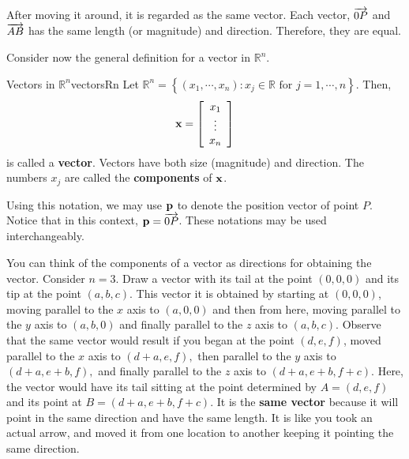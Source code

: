After moving it around, it is regarded as the same vector. Each vector, $\overrightarrow{0P}$ and $\overrightarrow{AB}$ has the same length (or magnitude) and direction. Therefore, they are equal. 

Consider now the general definition for a vector in $\mathbb{R}^n$. 

\begin{definition}{Vectors in $\mathbb{R}^n$}{vectorsRn}
Let $\mathbb{R}^{n} = \left\{ \left( x_{1}, \cdots, x_{n}\right)
:x_{j}\in \mathbb{R}\text{ for }j=1,\cdots ,n\right\} .$
Then,
\begin{equation*}
\mathbf{x}
=
\left[ \begin{array}{c}
x_{1} \\
\vdots \\
x_{n}
\end{array}
\right] 
\end{equation*}
is called a \textbf{vector}. Vectors have both size (magnitude) and direction. 
The numbers $x_{j}$ are called the \textbf{components}  of $\mathbf{x}$. 
\end{definition}

Using this notation, we may use $\mathbf{p}$ to denote the position vector of point $P$. Notice that in this context, $\mathbf{p} = \overrightarrow{0P}$. These notations may be used interchangeably. 

You can think of the components of a vector as directions for
obtaining the vector. Consider $n=3$.  Draw a vector with its tail at
the point $\left( 0,0,0\right) $ and its tip at the point $\left(
a,b,c\right) $. This vector it is obtained by starting at $\left(
0,0,0\right) $, moving parallel to the $x$ axis to $\left(
a,0,0\right) $ and then from here, moving parallel to the $y$ axis to
$\left( a,b,0\right) $ and finally parallel to the $z$ axis to $\left(
a,b,c\right). $ Observe that the same vector would result if you began
at the point $ \left( d,e,f \right)$, moved parallel to the $x$ axis
to $\left( d+a,e,f\right) ,$ then parallel to the $y$ axis to $\left(
d+a,e+b,f\right) ,$ and finally parallel to the $z$ axis to $\left(
d+a,e+b,f+c\right)$. Here, the vector would have its tail sitting at
the point determined by $A= \left( d,e,f\right) $ and its point at
$B=\left( d+a,e+b,f+c\right) .$ It is the \textbf{same vector} because
it will point in the same direction and have the same length. It is
like you took an actual arrow,  and moved it from one location to another keeping it pointing
the same direction.

